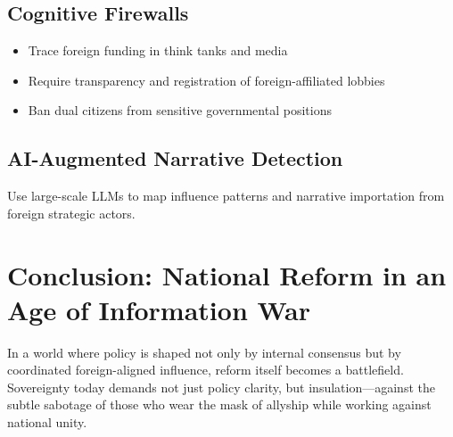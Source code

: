 \documentclass[11pt]{article}
\begin{document}
\subsection{Cognitive Firewalls}
\begin{itemize}
    \item Trace foreign funding in think tanks and media
    \item Require transparency and registration of foreign-affiliated lobbies
    \item Ban dual citizens from sensitive governmental positions
\end{itemize}

\subsection{AI-Augmented Narrative Detection}
Use large-scale LLMs to map influence patterns and narrative importation from foreign strategic actors.

\section{Conclusion: National Reform in an Age of Information War}
In a world where policy is shaped not only by internal consensus but by coordinated foreign-aligned influence, reform itself becomes a battlefield. Sovereignty today demands not just policy clarity, but insulation—against the subtle sabotage of those who wear the mask of allyship while working against national unity.
\end{document}
